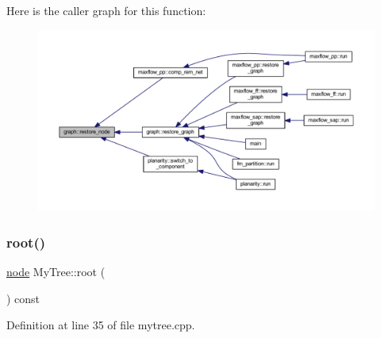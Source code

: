 Here is the caller graph for this function\+:
\nopagebreak
\begin{figure}[H]
\begin{center}
\leavevmode
\includegraphics[width=350pt]{classgraph_ab57aab79e649cc275052b7decbdd03ec_icgraph}
\end{center}
\end{figure}
\mbox{\label{class_my_tree_a04b0f390bb74c3bdb157cad08872076e}} 
\subsubsection{\texorpdfstring{root()}{root()}}
{\footnotesize\ttfamily \mbox{\hyperlink{classnode}{node}} My\+Tree\+::root (\begin{DoxyParamCaption}{ }\end{DoxyParamCaption}) const}



Definition at line 35 of file mytree.\+cpp.


